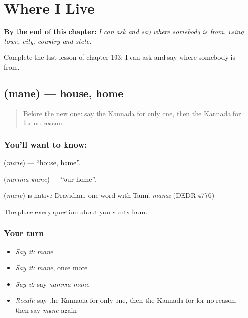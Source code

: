 
\chapter{Where I Live}
\label{ch:ka-where-i-live}

\begin{chapteropening}
\textbf{By the end of this chapter:} \emph{I can ask and say where somebody is from, using town, city, country and state.}

Complete the last lesson of chapter 103: I can ask and say where somebody is from.
\end{chapteropening}

\section[\texorpdfstring{\kn{ಮನೆ} (mane)}{ಮನೆ (mane)}]{ (mane) — house, home}

\label{lesson:KA-C103-house}



\begin{quote}
Before the new one: say the Kannada for only one, then the Kannada for for no reason.
\end{quote}

\subsection*{You'll want to know: }
\textbf{} (\emph{mane}) — \textquotedblleft{}house, home\textquotedblright{}.

\textbf{ } (\emph{namma mane}) — \textquotedblleft{}our home\textquotedblright{}.

\begin{cousinweb}
\textbf{} (\emph{mane}) is native Dravidian, one word with Tamil \emph{maṉai} (DEDR 4776).
\end{cousinweb}

\begin{grammarlens}[title={What you've built}]
The place every question about you starts from.
\end{grammarlens}

\subsection*{Your turn}
\begin{itemize}
\raggedright
  \item \emph{Say it:} \emph{mane}
  \item \emph{Say it:} \emph{mane}, once more
  \item \emph{Say it:} say \emph{namma mane}
  \item \emph{Recall:} say the Kannada for only one, then the Kannada for for no reason, then say \emph{mane} again
\end{itemize}

